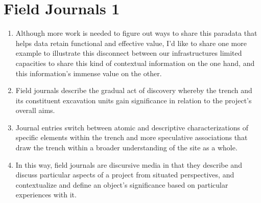 \documentclass[12pt]{article}
\begin{document}
\section{Field Journals 1}
\begin{enumerate}
  \item Although more work is needed to figure out ways to share this paradata that helps data retain functional and effective value, I'd like to share one more example to illustrate this disconnect between our infrastructures limited capacities to share this kind of contextual information on the one hand, and this information's immense value on the other.
  \item Field journals describe the gradual act of discovery whereby the trench and its constituent excavation units gain significance in relation to the project's overall aims.
  \item Journal entries switch between atomic and descriptive characterizations of specific elements within the trench and more speculative associations that draw the trench within a broader understanding of the site as a whole.
  \item In this way, field journals are discursive media in that they describe and discuss particular aspects of a project from situated perspectives, and contextualize and define an object's significance based on particular experiences with it.
\end{enumerate}
  
\end{document}
